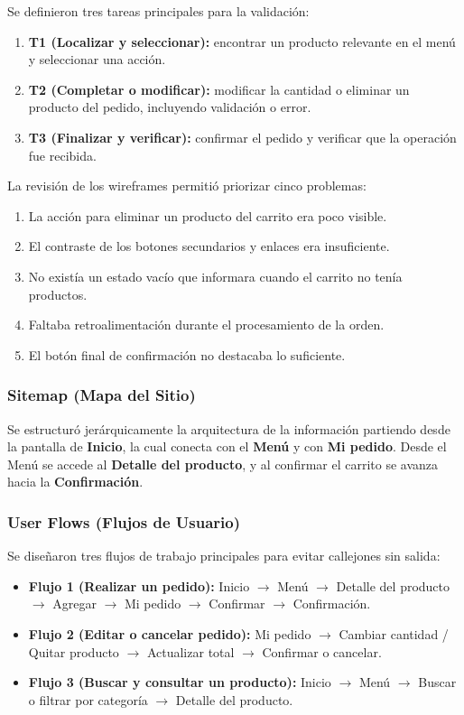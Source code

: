 \documentclass{article}
\begin{document}
Se definieron tres tareas principales para la validación:
\begin{enumerate}[leftmargin=1.5em, itemsep=3pt]
    \item \textbf{T1 (Localizar y seleccionar):} encontrar un producto relevante en el menú y seleccionar una acción.
    \item \textbf{T2 (Completar o modificar):} modificar la cantidad o eliminar un producto del pedido, incluyendo validación o error.
    \item \textbf{T3 (Finalizar y verificar):} confirmar el pedido y verificar que la operación fue recibida.
\end{enumerate}

La revisión de los wireframes permitió priorizar cinco problemas:
\begin{enumerate}[leftmargin=1.5em, itemsep=3pt]
    \item La acción para eliminar un producto del carrito era poco visible.
    \item El contraste de los botones secundarios y enlaces era insuficiente.
    \item No existía un estado vacío que informara cuando el carrito no tenía productos.
    \item Faltaba retroalimentación durante el procesamiento de la orden.
    \item El botón final de confirmación no destacaba lo suficiente.
\end{enumerate}

\subsubsection{Sitemap (Mapa del Sitio)}
Se estructuró jerárquicamente la arquitectura de la información partiendo desde la pantalla de \textbf{Inicio}, la cual conecta con el \textbf{Menú} y con \textbf{Mi pedido}. Desde el Menú se accede al \textbf{Detalle del producto}, y al confirmar el carrito se avanza hacia la \textbf{Confirmación}.

\subsubsection{User Flows (Flujos de Usuario)}
Se diseñaron tres flujos de trabajo principales para evitar callejones sin salida:
\begin{itemize}[leftmargin=1.5em, itemsep=3pt]
    \item \textbf{Flujo 1 (Realizar un pedido):} Inicio $\rightarrow$ Menú $\rightarrow$ Detalle del producto $\rightarrow$ Agregar $\rightarrow$ Mi pedido $\rightarrow$ Confirmar $\rightarrow$ Confirmación.
    \item \textbf{Flujo 2 (Editar o cancelar pedido):} Mi pedido $\rightarrow$ Cambiar cantidad / Quitar producto $\rightarrow$ Actualizar total $\rightarrow$ Confirmar o cancelar.
    \item \textbf{Flujo 3 (Buscar y consultar un producto):} Inicio $\rightarrow$ Menú $\rightarrow$ Buscar o filtrar por categoría $\rightarrow$ Detalle del producto.
\end{itemize}
\end{document}
